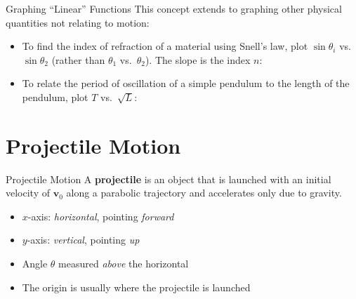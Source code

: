 \documentclass[12pt,compress,aspectratio=169]{beamer}
\begin{document}
\begin{frame}{Graphing ``Linear'' Functions}
  This concept extends to graphing other physical quantities not relating to
  motion:
  \begin{itemize}
  \item To find the index of refraction of a material using Snell's law, plot
    $\sin\theta_i$ vs.\ $\sin\theta_2$ (rather than $\theta_1$ vs.\ $\theta_2$).
    The slope is the index $n$:

  \item To relate the period of oscillation of a simple pendulum to the length
    of the pendulum, plot $T$ vs.\ $\sqrt{L}$:

  \end{itemize}
\end{frame}

\section{Projectile Motion}

\begin{frame}{Projectile Motion}
  A \textbf{projectile} is an object that is launched with an initial velocity
  of $\bm{v}_0$ along a parabolic trajectory and accelerates only due to
  gravity.
  \begin{center}
  \end{center}
  \begin{itemize}
  \item $x$-axis: \emph{horizontal}, pointing \emph{forward}
  \item $y$-axis: \emph{vertical}, pointing \emph{up}
  \item Angle $\theta$ measured \emph{above} the horizontal
  \item The origin is usually where the projectile is launched
  \end{itemize}
\end{frame}
\end{document}
